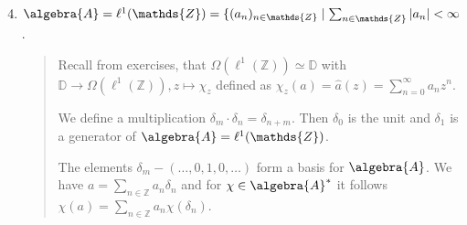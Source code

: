 \documentclass[a4paper]{article}
\begin{document}
\begin{example}~
	\begin{enumerate}
		\setcounter{enumi}{3}
		\item $\algebra{A} = \ell^1(\mathds{Z}) = \{ (a_n)_{n \in \mathds{Z}} \mid \sum_{n \in \mathds{Z}} |a_n| < \infty$.
		\begin{quote}
			Recall from exercises, that $\Omega(\ell^1(\mathds{Z})) \simeq \mathds{D}$ with $\mathds{D} \to \Omega(\ell^1(\mathds{Z})), z \mapsto \chi_z$ defined as $\chi_z(a) = \hat a (z) = \sum_{n=0}^{\infty}a_n z^n$.

			We define a multiplication $\delta_m \cdot \delta_n = \delta_{n + m}$. Then $\delta_0$ is the unit and $\delta_1$ is a generator of $\algebra{A} = \ell^1(\mathds{Z})$.

			The elements $\delta_m - (\dots, 0, 1, 0, \dots )$ form a basis for $\algebra{A}$.
			We have $a = \sum_{n \in \mathds{Z}} a_n \delta_n$ and for $\chi \in \algebra{A}^*$ it follows $\chi(a) = \sum_{n \in \mathds{Z}} a_n \chi(\delta_n)$.
		\end{quote}


\end{enumerate}
\end{example}
\end{document}
